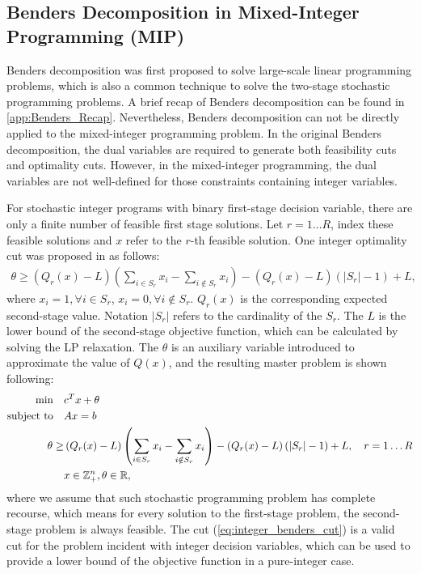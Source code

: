 \documentclass[preprint,review,11pt,authoryear]{elsarticle}
\begin{document}
\subsection{Benders Decomposition in Mixed-Integer Programming (MIP)} \label{subsec:Benders_MIP}
Benders decomposition was first proposed to solve large-scale linear programming problems, which is also a common technique to solve the two-stage stochastic programming problems. A brief recap of Benders decomposition can be found in \ref{app:Benders_Recap}. Nevertheless, Benders decomposition can not be directly applied to the mixed-integer programming problem. In the original Benders decomposition, the dual variables are required to generate both feasibility cuts and optimality cuts. However, in the mixed-integer programming, the dual variables are not well-defined for those constraints containing integer variables. 

For stochastic integer programs with binary first-stage decision variable, there are only a finite number of feasible first stage solutions. Let $ r = 1 \dots R$, index these feasible solutions and $x$ refer to the $r$-th feasible solution. One integer optimality cut was proposed in \cite{laporte1993integer} as follows:
\begin{align}
    \theta \geq \left( Q_{r}(x) - L \right) \left( \sum_{i \in S_r} x_i - \sum_{i \notin S_r} x_i \right) - \left( Q_{r}(x) - L \right) (|S_r| - 1) + L, \label{eq:integer_benders_cut} 
\end{align}
where $x_i = 1, \forall i \in S_r$, $x_i = 0, \forall i \notin S_r$. $Q_r(x)$ is the corresponding expected second-stage value. Notation $|S_r|$ refers to the cardinality of the $S_r$. The $L$ is the lower bound of the second-stage objective function, which can be calculated by solving the LP relaxation. The $\theta$ is an auxiliary variable introduced to approximate the value of $Q(x)$, and the resulting master problem is shown following:
\begin{subequations} 
    \begin{align*}
              \min \quad & c^T x + \theta \\
        \operatorname{subject~to} \quad & Ax = b  \\
                         \theta \geq & \left( Q_{r}(x) - L \right) \left( \sum_{i \in S_r} x_i - \sum_{i \notin S_r} x_i \right) - \left( Q_{r}(x) - L \right) (|S_r| - 1) + L, \quad r = 1 \dots R\\
                         & x \in \mathbb{Z}^n_+, \theta \in \mathbb{R},
    \end{align*}
\end{subequations}
where we assume that such stochastic programming problem has complete recourse, which means for every solution to the first-stage problem, the second-stage problem is always feasible. The cut (\ref{eq:integer_benders_cut}) is a valid cut for the problem incident with integer decision variables, which can be used to provide a lower bound of the objective function in a pure-integer case.
\end{document}
